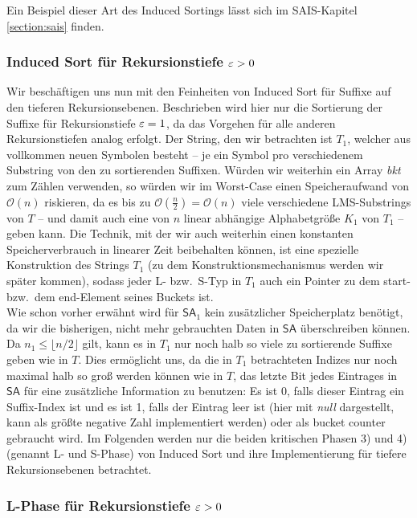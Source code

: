 Ein Beispiel dieser Art des Induced Sortings lässt sich im SAIS-Kapitel \ref{section:sais} finden.

\subsubsection{ Induced Sort für Rekursionstiefe $\varepsilon > 0$}

Wir beschäftigen uns nun mit den Feinheiten von Induced Sort für Suffixe auf den tieferen Rekursionsebenen. Beschrieben wird hier nur die Sortierung der Suffixe für Rekursionstiefe $\varepsilon = 1$, da das Vorgehen für alle anderen Rekursionstiefen analog erfolgt. Der String, den wir betrachten ist $T_1$, welcher aus vollkommen neuen Symbolen besteht -- je ein Symbol pro verschiedenem Substring von den zu sortierenden Suffixen. Würden wir weiterhin ein Array \textit{bkt} zum Zählen verwenden, so würden wir im Worst-Case einen Speicheraufwand von $\mathcal O(n)$ riskieren, da es bis zu $\mathcal O(\frac{n}{2}) = \mathcal O(n)$ viele verschiedene LMS-Substrings von $T$ -- und damit auch eine von $n$ linear abhängige Alphabetgröße $K_1$ von $T_1$ -- geben kann. Die Technik, mit der wir auch weiterhin einen konstanten Speicherverbrauch in linearer Zeit beibehalten können, ist eine spezielle Konstruktion des Strings $T_1$ (zu dem Konstruktionsmechanismus werden wir später kommen), sodass jeder L- bzw.\ S-Typ in $T_1$ auch ein Pointer zu dem start- bzw.\ dem end-Element seines Buckets ist.  \\
Wie schon vorher erwähnt wird für $\mathsf{SA}_1$ kein zusätzlicher Speicherplatz benötigt, da wir die bisherigen, nicht mehr gebrauchten Daten in $\mathsf{SA}$ überschreiben können. Da $n_1  \leq \lfloor n/2 \rfloor$ gilt, kann es in $T_1$ nur noch halb so viele zu sortierende Suffixe geben wie in $T$. Dies ermöglicht uns, da die in $T_1$ betrachteten Indizes nur noch maximal halb so groß werden können wie in $T$, das letzte Bit jedes Eintrages in $\mathsf{SA}$ für eine zusätzliche Information zu benutzen: Es ist 0, falls dieser Eintrag ein Suffix-Index ist und es ist 1, falls der Eintrag leer ist (hier mit \textit{null} dargestellt, kann als größte negative Zahl implementiert werden) oder als bucket counter gebraucht wird. Im Folgenden werden nur die beiden kritischen Phasen 3) und 4) (genannt L- und S-Phase) von Induced Sort und ihre Implementierung für tiefere Rekursionsebenen betrachtet.

\subsubsection{ L-Phase für Rekursionstiefe $\varepsilon > 0$}

